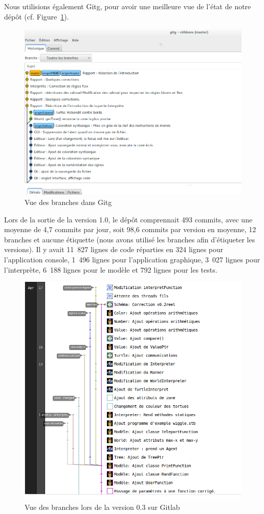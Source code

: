 Nous utilisions également Gitg, pour avoir une meilleure vue de l'état de notre dépôt (cf. Figure~\ref{Gitg}).

\begin{figure}[h]
\centering
\includegraphics[scale=0.35]{doc/gestionProjet/gitbranche.png}
\caption{\label{Gitg} Vue des branches dans Gitg}
\end{figure}

Lors de la sortie de la version 1.0, le dépôt comprennait 493 commits, avec une moyenne de 4,7 commits par jour, soit 98,6 commits par version en moyenne, 12 branches et aucune étiquette (nous avons utilisé les branches afin d'étiqueter les versions).
Il y avait 11~827 lignes de code réparties en 324 lignes pour l'application console, 1~496 lignes pour l'application graphique, 3~027 lignes pour l'interprète, 6~188 lignes pour le modèle et 792 lignes pour les tests.

\begin{figure}[h]
\centering
\includegraphics[scale=0.35]{doc/report/uml/network-v3.png}
\caption{\label{branche} Vue des branches lors de la version 0.3 sur Gitlab}
\end{figure}

